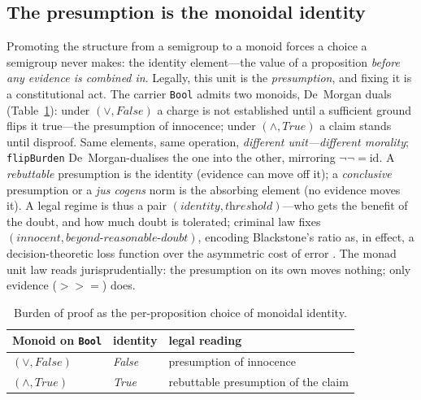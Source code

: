 \documentclass[sigconf,nonacm]{acmart}
\newcommand{\code}[1]{\texttt{\small #1}}
\begin{document}
\subsection{The presumption is the monoidal identity}
Promoting the structure from a semigroup to a monoid forces a choice a
semigroup never makes: the identity element---the value of a proposition
\emph{before any evidence is combined in}. Legally, this unit is the
\emph{presumption}, and fixing it is a constitutional act. The carrier
\code{Bool} admits two monoids, De~Morgan duals
(Table~\ref{tab:presumption}): under $(\vee, \textit{False})$ a charge is not
established until a sufficient ground flips it true---the presumption of
innocence; under $(\wedge, \textit{True})$ a claim stands until disproof.
Same elements, same operation, \emph{different unit---different morality};
\code{flipBurden} De~Morgan-dualises the one into the other, mirroring
$\neg\neg = \mathrm{id}$. A \emph{rebuttable} presumption is the identity
(evidence can move off it); a \emph{conclusive} presumption or a \emph{jus
cogens} norm is the absorbing element (no evidence moves it). A legal regime
is thus a pair $(\textit{identity}, \textit{threshold})$---who gets the
benefit of the doubt, and how much doubt is tolerated; criminal law fixes
$(\textit{innocent}, \textit{beyond-reasonable-doubt})$, encoding
Blackstone's ratio \cite{blackstone1769} as, in effect, a decision-theoretic
loss function over the asymmetric cost of error \cite{hayspier1997burdens}.
The monad unit law reads jurisprudentially: the presumption on its own moves
nothing; only evidence ($\mathbin{>\!\!>\!\!=}$) does.

\begin{table}[t]
\caption{Burden of proof as the per-proposition choice of monoidal identity.}
\label{tab:presumption}
\small
\begin{tabular}{@{}lll@{}}
\toprule
\textbf{Monoid on \texttt{Bool}} & \textbf{identity} & \textbf{legal reading} \\
\midrule
$(\vee, \textit{False})$  & \textit{False} & presumption of innocence \\
$(\wedge, \textit{True})$ & \textit{True}  & rebuttable presumption of the claim \\
\bottomrule
\end{tabular}
\end{table}
\end{document}
